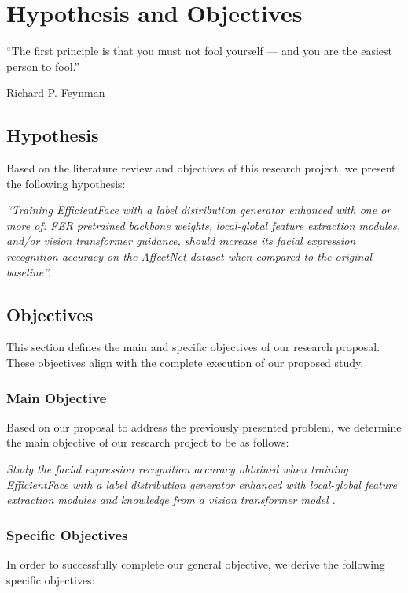 \chapter{Hypothesis and Objectives}
\label{chapter:hypothesis-objectives}
\epigraph{``The first principle is that you must not fool yourself --- and you are the easiest person to fool.''}{\vspace{10pt}Richard P. Feynman}

\newpage


\section{Hypothesis}
\label{section:hypothesis}
Based on the literature review and objectives of this research project, we present the following hypothesis:

\textit{``Training EfficientFace with a label distribution generator enhanced with one or more of: FER pretrained backbone weights, local-global feature extraction modules, and/or vision transformer guidance, should increase its facial expression recognition accuracy on the AffectNet dataset when compared to the original baseline''.}

\section{Objectives}
\label{section:objectives}
This section defines the main and specific objectives of our research proposal.\\
These objectives align with the complete execution of our proposed study.

\subsection{Main Objective}
\label{section:main-objective}
Based on our proposal to address the previously presented problem, we determine the main objective of our research project to be as follows:

\textit{Study the facial expression recognition accuracy obtained when training EfficientFace \cite{eff-face2021} with a label distribution generator enhanced with local-global feature extraction modules and knowledge from a vision transformer model \cite{apvit2023}. }

\subsection{Specific Objectives}
\label{section:specific-objectives}
In order to successfully complete our general objective, we derive the following specific objectives:

